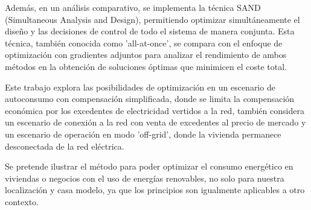 Además, en un análisis comparativo, se implementa la técnica SAND (Simultaneous
Analysis and Design), permitiendo optimizar simultáneamente el diseño y las
decisiones de control de todo el sistema de manera conjunta. Esta técnica,
también conocida como 'all-at-once', se compara con el enfoque de optimización
con gradientes adjuntos para analizar el rendimiento de ambos métodos en la
obtención de soluciones óptimas que minimicen el coste total.

Este trabajo explora las posibilidades de optimización en un escenario de
autoconsumo con compensación simplificada, donde se limita la compensación
económica por los excedentes de electricidad vertidos a la red, también
considera un escenario de conexión a la red con venta de excedentes al precio
de mercado y un escenario de operación en modo 'off-grid', donde la vivienda
permanece desconectada de la red eléctrica.

Se pretende ilustrar el método para poder optimizar el consumo energético en
viviendas o negocios con el uso de energías renovables, no solo para nuestra
localización y casa modelo, ya que los principios son igualmente aplicables a
otro contexto.
